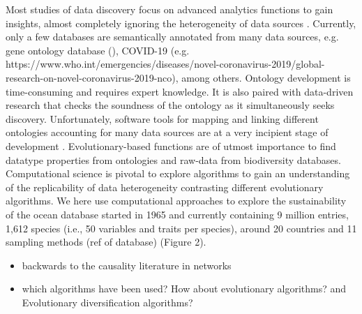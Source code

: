 \documentclass[12pt,a4paper]{article}
\begin{document}
Most studies of data discovery focus on advanced analytics functions to gain insights, almost completely ignoring the heterogeneity of data sources \citep{azeroual2019solving}. Currently, only a few databases are semantically annotated from many data sources, e.g. gene ontology database (\citep{gene2021gene}), COVID-19 (e.g. https://www.who.int/emergencies/diseases/novel-coronavirus-2019/global-research-on-novel-coronavirus-2019-nco), among others. Ontology development is time-consuming and requires expert knowledge. It is also paired with data-driven research that checks the soundness of the ontology as it simultaneously seeks discovery. Unfortunately, software tools for mapping and linking different ontologies accounting for many data sources are at a very incipient stage of development \cite{nsf,KGcovid19,Oavida}. Evolutionary-based functions are of utmost importance to find datatype properties from ontologies and raw-data from biodiversity databases. Computational science is pivotal to explore algorithms to gain an understanding of the replicability of data heterogeneity contrasting different evolutionary algorithms. We here use computational approaches to explore the sustainability of the ocean database started in 1965 and currently containing 9 million entries, 1,612 species (i.e., 50 variables and traits per species), around 20 countries and 11 sampling methods (ref of database) (Figure 2).
\\
\begin{itemize}
    \item backwards to the causality literature in networks
    \item which algorithms have been used? How about evolutionary algorithms? and Evolutionary diversification algorithms?
\end{itemize}
\end{document}
